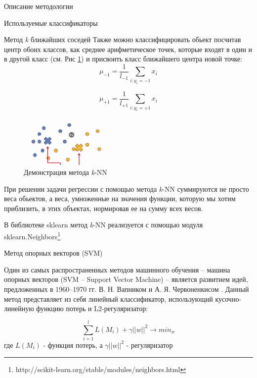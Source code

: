 \begin{section}{Описание методологии}
\begin{subsection}{Используемые классификаторы}
\begin{subsubsection}{Метод \textit{k} ближайших соседей}
Также можно классифицировать обьект посчитав центр обоих классов, как среднее арифметическое точек, которые входят в один и в другой класс (см. Рис \ref{pic:knn4}) и присвоить класс ближайшего центра новой точке:
\begin{equation}
\mu_{-1} = \frac{1}{l_{-1}} \sum\limits_{i: y_i = -1} x_i
\end{equation}

\begin{equation}
\mu_{+1} = \frac{1}{l_{+1}} \sum\limits_{i: y_i = +1} x_i
\end{equation}

\begin{figure}[ht!]
\centering
\includegraphics[width=0.4\textwidth]{pics/knn4}
\caption{Демонстрация метода \textit{k}-NN}
\label{pic:knn4}
\end{figure}

При решении задачи регрессии с помощью метода \textit{k}-NN  суммируются не просто веса обьектов, а веса, умноженные на значения функции, которую мы хотим приблизить, в этих объектах, нормировав ее на сумму всех весов.

В библиотеке sklearn метод \textit{k}-NN реализуется с помощью модуля sklearn.Neighbors\footnote{http://scikit-learn.org/stable/modules/neighbors.html}

\end{subsubsection}

    \begin{subsubsection}{Метод опорных векторов (SVM)}
	\label{svm}

Один из самых распространенных методов машинного обучения – машина опорных векторов (SVM – Support Vector Machine) – является развитием идей, предложенных в 1960–1970 гг. В. Н. Вапником и А. Я. Червоненкисом \cite{wiki:SVM}.
Данный метод представляет из себя линейный классификатор, использующий кусочно-линейную функцию потерь и L2-регуляризатор:

\begin{equation}
\sum\limits_{i=1}^l L(M_i) + \gamma ||w||^2 \rightarrow min_{w}
\end{equation}
где $L(M_i)$ - функция потерь, а $\gamma ||w||^2$ - регуляризатор


\end{subsubsection}
\end{subsection}
\end{section}
